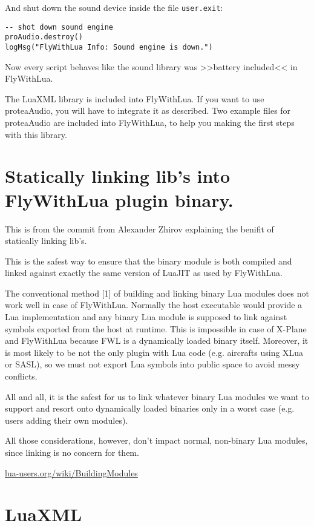 \documentclass[11pt,parskip=half,a4paper]{scrartcl}
\begin{document}
And shut down the sound device inside the file \verb|user.exit|:

\begin{lstlisting}[firstnumber=1]
-- shot down sound engine
proAudio.destroy()
logMsg("FlyWithLua Info: Sound engine is down.")
\end{lstlisting}

Now every script behaves like the sound library was >>battery included<< in FlyWithLua. 

The LuaXML library is included into FlyWithLua. If you want to use proteaAudio, you will have to integrate it as described. Two example files for proteaAudio are included into FlyWithLua, to help you making the first steps with this library.

\newpage

\section{Statically linking lib's into FlyWithLua plugin binary. }

This is from the commit from Alexander Zhirov explaining the benifit of statically linking lib's.

This is the safest way to ensure that the binary module is both compiled
and linked against exactly the same version of LuaJIT as used by
FlyWithLua.

The conventional method [1] of building and linking binary Lua modules
does not work well in case of FlyWithLua. Normally the host executable
would provide a Lua implementation and any binary Lua module is supposed
to link against symbols exported from the host at runtime. This is
impossible in case of X-Plane and FlyWithLua because FWL is a
dynamically loaded binary itself. Moreover, it is most likely to be not
the only plugin with Lua code (e.g. aircrafts using XLua or SASL), so we
must not export Lua symbols into public space to avoid messy conflicts.

All and all, it is the safest for us to link whatever binary Lua modules
we want to support and resort onto dynamically loaded binaries only in a
worst case (e.g. users adding their own modules).

All those considerations, however, don't impact normal, non-binary Lua
modules, since linking is no concern for them.

\href{http://lua-users.org/wiki/BuildingModules}{lua-users.org/wiki/BuildingModules}

\newpage
\section{LuaXML}
\end{document}
